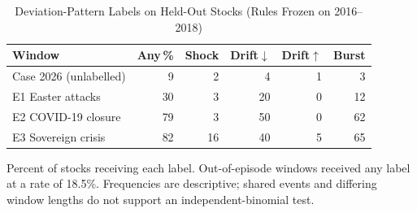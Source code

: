 \begin{table}[!t]
\caption{Deviation-Pattern Labels on Held-Out Stocks (Rules Frozen on 2016--2018)}
\label{tab:ms_patterns}
\centering\footnotesize\setlength{\tabcolsep}{2.2pt}
\begin{tabular}{@{}lrrrrr@{}}
\toprule
Window & Any\,\% & Shock & Drift$\downarrow$ & Drift$\uparrow$ & Burst \\
\midrule
Case 2026 (unlabelled) & 9 & 2 & 4 & 1 & 3 \\
E1 Easter attacks & 30 & 3 & 20 & 0 & 12 \\
E2 COVID-19 closure & 79 & 3 & 50 & 0 & 62 \\
E3 Sovereign crisis & 82 & 16 & 40 & 5 & 65 \\
\bottomrule
\end{tabular}
\vspace{2pt}
\parbox{\columnwidth}{\scriptsize Percent of stocks receiving each label. Out-of-episode windows received any label at a rate of 18.5\%. Frequencies are descriptive; shared events and differing window lengths do not support an independent-binomial test.}
\end{table}
